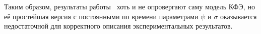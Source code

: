 Таким образом, результаты работы~\cite{chmela1998puzzling} хоть и не опровергают саму модель КФЭ, но её простейшая версия с постоянными по времени параметрами $\psi$ и $\sigma$ оказывается недостаточной для корректного описания экспериментальных результатов.






